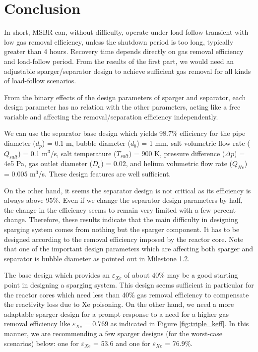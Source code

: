\newpage
\FloatBarrier

\section{Conclusion}

    In short, MSBR can, without difficulty, operate under load follow transient with low gas removal efficiency, unless the shutdown period is too long, typically greater than 4 hours. Recovery time depends directly on gas removal efficiency and load-follow period. From the results of the first part, we would need an adjustable sparger/separator design to achieve sufficient gas removal for all kinds of load-follow scenarios.

    From the binary effects of the design parameters of sparger and separator, each design parameter has no relation with the other parameters, acting like a free variable and affecting the removal/separation efficiency independently.

    We can use the separator base design which yields 98.7\% efficiency for the pipe diameter ($d_p$) = 0.1 m, bubble diameter ($d_b$) = 1 mm, salt volumetric flow rate ($Q_{salt}$) = 0.1 m$^{3}$/s, salt temperature ($T_{salt}$) = 900 K, pressure difference ($\Delta p$) = 4e5 Pa, gas outlet diameter ($D_o$) = 0.02, and helium volumetric flow rate ($Q_{He}$) = 0.005 m$^{3}$/s. These design features are well sufficient.

    On the other hand, it seems the separator design is not critical as its efficiency is always above 95\%. Even if we change the separator design parameters by half, the change in the efficiency seems to remain very limited with a few percent change. Therefore, these results indicate that the main difficulty in designing sparging system comes from nothing but the sparger component. It has to be designed according to the removal efficiency imposed by the reactor core. Note that one of the important design parameters which are affecting both sparger and separator is bubble diameter as pointed out in Milestone 1.2.

    The base design which provides an $\varepsilon$$_{Xe}$ of about 40\% may be a good starting point in designing a sparging system. This design seems sufficient in particular for the reactor cores which need less than 40\% gas removal efficiency to compensate the reactivity loss due to Xe poisoning. On the other hand, we need a more adaptable sparger design for a prompt response to a need for a higher gas removal efficiency like $\varepsilon$$_{Xe}$ = 0.769 as indicated in Figure \ref{fig:triple_keff}. In this manner, we are recommending a few sparger designs (for the worst-case scenarios) below: one for $\varepsilon$$_{Xe}$ = 53.6 and one for $\varepsilon$$_{Xe}$ = 76.9\%.

